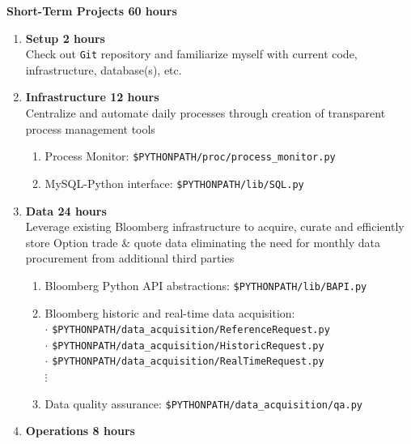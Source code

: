 \documentclass[6pt]{article}
\begin{document}
\textbf{\Large{Short-Term Projects \hfill 60 hours}} \\
\begin{enumerate}\addtocounter{enumi}{-1}
  \item \textbf{Setup \hfill 2 hours} \\
    Check out \texttt{Git} repository and familiarize myself with current code,
    infrastructure, database(s), etc. \\
  \item \textbf{Infrastructure \hfill 12 hours} \\
    Centralize and automate daily processes through creation of transparent
    process management tools  \\
    \begin{enumerate}
      \item Process Monitor: \texttt{\$PYTHONPATH/proc/process\_monitor.py} \\
      \item MySQL-Python interface: \texttt{\$PYTHONPATH/lib/SQL.py} \hfill \\
    \end{enumerate}
  \item \textbf{Data \hfill 24 hours} \\
    Leverage existing Bloomberg infrastructure to acquire, curate and efficiently
    store Option trade \& quote data eliminating the need for monthly data procurement
    from additional third parties \\
    \begin{enumerate}
      \item Bloomberg Python API abstractions: \texttt{\$PYTHONPATH/lib/BAPI.py} \\
      \item Bloomberg historic and real-time data acquisition: \\
        $\cdot$ \texttt{\$PYTHONPATH/data\_acquisition/ReferenceRequest.py} \\
        $\cdot$ \texttt{\$PYTHONPATH/data\_acquisition/HistoricRequest.py} \\
        $\cdot$ \texttt{\$PYTHONPATH/data\_acquisition/RealTimeRequest.py} \\
        $\vdots$ \\
      \item Data quality assurance: \texttt{\$PYTHONPATH/data\_acquisition/qa.py} \\
    \end{enumerate}
  \item \textbf{Operations \hfill 8 hours} \\

\end{enumerate}
\end{document}

